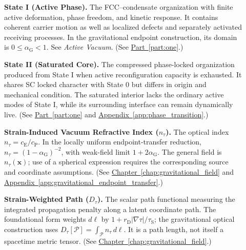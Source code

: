 \begin{description}
\item[] \begin{minipage}[t]{\linewidth}
\textbf{State I (Active Phase).} The FCC--condensate organization with finite active deformation, phase freedom, and kinetic response. It contains coherent carrier motion as well as localized defects and separately activated receiving processes. In the gravitational endpoint construction, its domain is $0\leq\alpha_{\mathrm G}<1$. See \emph{Active Vacuum}.
(See \hyperref[part:one]{Part~\ref*{part:one}}.)
\end{minipage}

\item[] \begin{minipage}[t]{\linewidth}
\textbf{State II (Saturated Core).} The compressed phase-locked organization produced from State I when active reconfiguration capacity is exhausted. It shares SC locked character with State 0 but differs in origin and mechanical condition. The saturated interior lacks the ordinary active modes of State I, while its surrounding interface can remain dynamically live.
(See \hyperref[part:one]{Part~\ref*{part:one}} and \hyperref[app:phase_transition]{Appendix~\ref*{app:phase_transition}}.)
\end{minipage}

\item[] \begin{minipage}[t]{\linewidth}
\textbf{Strain-Induced Vacuum Refractive Index ($n_\tau$).} The optical index $n_\tau=c_{\mathrm E}/c_{\mathrm P}$. In the locally uniform endpoint-transfer reduction, $n_\tau=(1-\alpha_{\mathrm G})^{-2}$, with weak-field limit $1+2\alpha_{\mathrm G}$. The general field is $n_\tau(\mathbf x)$; use of a spherical expression requires the corresponding source and coordinate assumptions.
(See \hyperref[chap:gravitational_field]{Chapter~\ref*{chap:gravitational_field}} and \hyperref[app:gravitational_endpoint_transfer]{Appendix~\ref*{app:gravitational_endpoint_transfer}}.)
\end{minipage}

\item[] \begin{minipage}[t]{\linewidth}
\textbf{Strain-Weighted Path ($D_\tau$).} The scalar path functional measuring the integrated propagation penalty along a latent coordinate path. The foundational form weights $d\ell$ by $1+r_{\mathrm D}|\nabla\tau|/\tau_{\mathrm S}$; the gravitational optical construction uses $D_\tau[\mathcal P]=\int_{\mathcal P}n_\tau\,d\ell$. It is a path length, not itself a spacetime metric tensor.
(See \hyperref[chap:gravitational_field]{Chapter~\ref*{chap:gravitational_field}}.)
\end{minipage}


\end{description}
